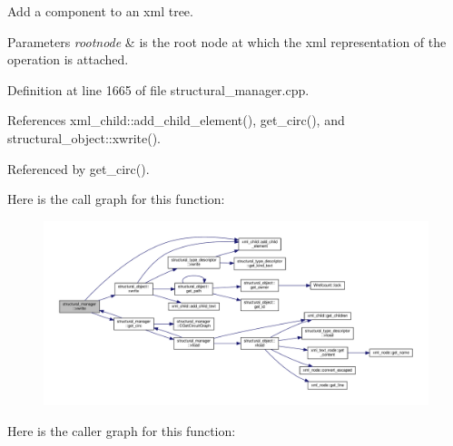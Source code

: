 Add a component to an xml tree. 


\begin{DoxyParams}{Parameters}
{\em rootnode} & is the root node at which the xml representation of the operation is attached. \\
\hline
\end{DoxyParams}


Definition at line 1665 of file structural\+\_\+manager.\+cpp.



References xml\+\_\+child\+::add\+\_\+child\+\_\+element(), get\+\_\+circ(), and structural\+\_\+object\+::xwrite().



Referenced by get\+\_\+circ().

Here is the call graph for this function\+:
\nopagebreak
\begin{figure}[H]
\begin{center}
\leavevmode
\includegraphics[width=350pt]{d7/d6b/classstructural__manager_a1357e1db0d3895ee2fd084a109f242d7_cgraph}
\end{center}
\end{figure}
Here is the caller graph for this function\+:
\nopagebreak
